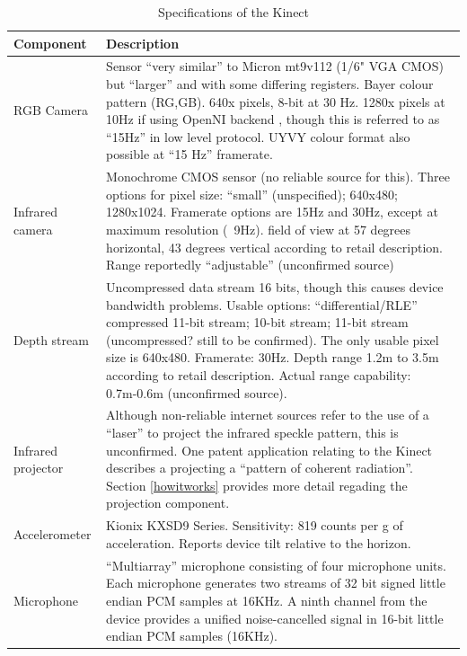 \begin{table}[ht]
\centering
\begin{tabular}{l p{10cm}}
\toprule
Component & Description \\
\midrule

RGB Camera & Sensor ``very similar'' to Mi\-cron mt9v112 (1/6" VGA CMOS) but
``larger'' and with some di\-ffering reg\-isters. Bay\-er co\-lour pa\-ttern (RG,GB).
640x\-480 pixels, 8-bit at 30 Hz.  1280x\-1024 pixels at 10\-Hz if using Open\-NI backend
, though this is referred to as ``15Hz'' in low level pro\-tocol. UYVY co\-lour
for\-mat also possible at ``15 Hz'' framerate.\cite{FREENECT}\cite{RGBDEMO} \\

Infrared camera & Monochrome CMOS sensor (no reliable source for this). Three
options for pixel size: ``small'' (unspecified); 640x480; 1280x1024. Framerate
options are 15Hz and 30Hz, except at maximum resolution (~9Hz).\cite{FREENECT}
field of view at 57 degrees horizontal, 43 degrees vertical according to retail
description.\cite{PLAY} Range reportedly ``adjustable'' (unconfirmed source) \\ 

Depth stream & Uncompressed data stream 16 bits, though this causes device
bandwidth problems. Usable options: ``differential/RLE'' compressed 11-bit
stream; 10-bit stream; 11-bit stream (uncompressed? still to be confirmed). The
only usable pixel size is 640x480. Framerate: 30Hz. \cite{FREENECT} Depth range
1.2m to 3.5m according to retail description.\cite{PLAY} Actual range
capability: ~ 0.7m-0.6m (unconfirmed source).\\

Infrared projector & Although non-reliable internet sources refer to the use of
a ``laser'' to project the infrared speckle pattern, this is unconfirmed. One
patent application relating to the Kinect describes a projecting a ``pattern of
coherent radiation''.\cite{SHPUNT:2010-1} Section \ref{howitworks} provides more
detail regading the projection component. \\

Accelerometer & Kionix KXSD9 Series. Sensitivity: 819 counts per g of
acceleration. Reports device tilt relative to the
horizon.\cite{FREENECT}\cite{KIONIX}\\

Microphone & ``Multiarray'' microphone consisting of four microphone units. Each
microphone generates two streams of 32 bit signed little endian PCM samples at
16KHz. A ninth channel from the device provides a unified noise-cancelled signal
in 16-bit little endian PCM samples (16KHz).\cite{FREENECT}\\

\bottomrule
\end{tabular}
\caption{Specifications of the Kinect}
\label{tab:specs}
\end{table}


